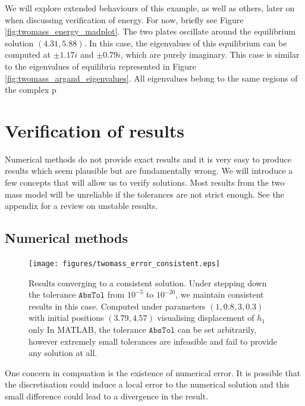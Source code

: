 We will explore extended behaviours of this example, as well as others, later on when discussing verification of energy. For now, briefly see Figure \ref{fig:twomass_energy_madplot}.
The two plates oscillate around the equilibrium solution \((4.31,5.88)\).
In this case, the eigenvalues of this equilibrium can be computed at $\pm 1.17i$ and $\pm 0.79i$,
which are purely imaginary.
This case is similar to the eigenvalues of equilibria represented in Figure \ref{fig:twomass_argand_eigenvalues}. All eigenvalues belong to the same regions of the complex p

\section{Verification of results}

Numerical methods do not provide exact results and it is very easy to produce results which seem plausible but are fundamentally wrong.
We will introduce a few concepts that will allow us to verify solutions.
Most results from the two mass model will be unreliable if the tolerances are not strict enough.
See the appendix for a review on unstable results.

\subsection{Numerical methods}

\begin{figure}[h!]
    \centering
    \texttt{[image: figures/twomass\_error\_consistent.eps]}
    \caption{
        Results converging to a consistent solution.
        Under stepping down the tolerance \(\mathtt{AbsTol}\) from $10^{-5}$ to $10^{-20}$,
        we maintain consistent results in this case.
        Computed under parameters \((1, 0.8, 3, 0.3)\) with initial positions \((3.79, 4.57)\) visualising displacement of $h_1$ only
        In MATLAB, the tolerance $\mathtt{AbsTol}$ can be set arbitrarily,
        however extremely small tolerances are infeasible and fail to provide any solution at all.
    }
    \label{fig:twomass_stepping_convergence}
\end{figure}

One concern in compuation is the existence of numerical error.
It is possible that the discretisation could induce a local error to the numerical solution and this small difference could lead to a divergence in the result.

